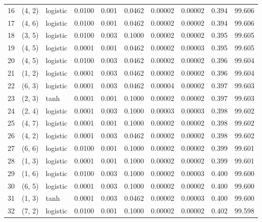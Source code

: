 \begin{tabular}{lllrrrrrrr}
16  &      (4, 2) &  logistic &  0.0100 &  0.001 &  0.0462 &          0.00002 &    0.00002 &       0.394 &    99.606 \\
17  &      (4, 6) &  logistic &  0.0100 &  0.001 &  0.0462 &          0.00002 &    0.00002 &       0.394 &    99.606 \\
18  &      (3, 5) &  logistic &  0.0100 &  0.003 &  0.1000 &          0.00002 &    0.00002 &       0.395 &    99.605 \\
19  &      (4, 5) &  logistic &  0.0001 &  0.001 &  0.0462 &          0.00002 &    0.00003 &       0.395 &    99.605 \\
20  &      (4, 5) &  logistic &  0.0100 &  0.003 &  0.0462 &          0.00002 &    0.00002 &       0.396 &    99.604 \\
21  &      (1, 2) &  logistic &  0.0001 &  0.003 &  0.0462 &          0.00002 &    0.00002 &       0.396 &    99.604 \\
22  &      (6, 3) &  logistic &  0.0001 &  0.003 &  0.0462 &          0.00004 &    0.00002 &       0.397 &    99.603 \\
23  &      (2, 3) &      tanh &  0.0001 &  0.001 &  0.1000 &          0.00002 &    0.00002 &       0.397 &    99.603 \\
24  &      (2, 4) &  logistic &  0.0001 &  0.003 &  0.1000 &          0.00003 &    0.00003 &       0.398 &    99.602 \\
25  &      (4, 7) &  logistic &  0.0001 &  0.001 &  0.1000 &          0.00002 &    0.00002 &       0.398 &    99.602 \\
26  &      (4, 2) &  logistic &  0.0001 &  0.003 &  0.0462 &          0.00002 &    0.00002 &       0.398 &    99.602 \\
27  &      (6, 6) &  logistic &  0.0100 &  0.001 &  0.1000 &          0.00002 &    0.00002 &       0.399 &    99.601 \\
28  &      (1, 3) &  logistic &  0.0001 &  0.001 &  0.1000 &          0.00002 &    0.00002 &       0.399 &    99.601 \\
29  &      (1, 6) &  logistic &  0.0100 &  0.003 &  0.1000 &          0.00002 &    0.00003 &       0.400 &    99.600 \\
30  &      (6, 5) &  logistic &  0.0001 &  0.003 &  0.1000 &          0.00002 &    0.00002 &       0.400 &    99.600 \\
31  &      (1, 3) &      tanh &  0.0001 &  0.003 &  0.0462 &          0.00002 &    0.00003 &       0.400 &    99.600 \\
32  &      (7, 2) &  logistic &  0.0100 &  0.001 &  0.1000 &          0.00002 &    0.00002 &       0.402 &    99.598 \\

\end{tabular}
